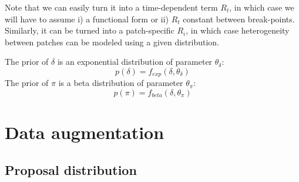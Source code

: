\documentclass[a4paper,11pt]{article}
\begin{document}
Note that we can easily turn it into a time-dependent term $R_t$, in which 
case 
we will have to assume i) a functional form or ii) $R_t$ constant 
between break-points. 
Similarly, it can be turned into a patch-specific $R_i$, in which case 
heterogeneity between patches can be modeled using a given distribution.
% 


The prior of $\delta$ is an exponential distribution of parameter 
$\theta_{\delta}$:
\begin{equation}
p(\delta) = f_{exp}(\delta,  \theta_{\delta})
\end{equation}
The prior of $\pi$ is a beta distribution of parameter 
$\theta_{\pi}$:
\begin{equation}
p(\pi) = f_{beta}(\delta,  \theta_{\pi})
\end{equation}





\section{Data augmentation}

\subsection{Proposal distribution}
\end{document}
